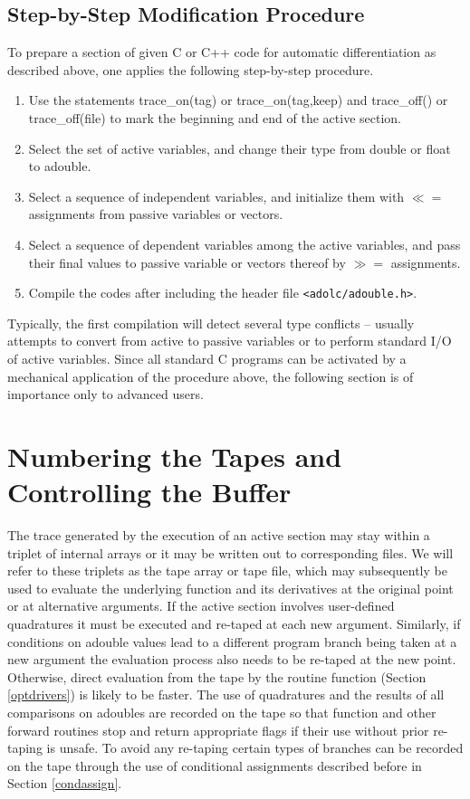 \documentclass[11pt,twoside]{article}
\begin{document}
\subsection{Step-by-Step Modification Procedure}
%
To prepare a section of given C or C++ code for automatic
differentiation as described above, one applies the following step-by-step procedure.
\begin{enumerate}
\item
Use the statements {\sf trace\_on(tag)} or {\sf trace\_on(tag,keep)}
and {\sf trace\_off()} or {\sf trace\_off(file)} to mark the
beginning and end of the active section. 
\item 
Select the set of active variables, and change their type from
{\sf double} or {\sf float} to {\sf adouble}.
\item
Select a sequence of independent variables, and initialize them with
\boldmath $\ll=$ \unboldmath assignments from passive variables or vectors.
\item
Select a sequence of dependent variables among the active variables,
and pass their final values to passive variable or vectors thereof
by \boldmath $\gg=$ \unboldmath assignments.
\item 
Compile the codes after including the header file \verb=<adolc/adouble.h>=. 
\end{enumerate}
Typically, the first compilation will detect several type conflicts
-- usually attempts to convert from active to passive
variables or to perform standard I/O of active variables.
Since all standard
C programs can be activated by a mechanical application of the
procedure above, the following section is of importance
only to advanced users. 
%                                                                  
\section{Numbering the Tapes and Controlling the Buffer}
\label{tape}
%
The trace generated by the execution of an active section may stay
within a triplet of internal arrays or it may be written out
to corresponding files. We will refer to these triplets as the 
tape array or tape file, which may subsequently be used to evaluate the
underlying function and its derivatives at the original point or at 
alternative arguments. If the active section involves user-defined
quadratures it must be executed and
re-taped at each new argument. Similarly, if conditions on
{\sf adouble} values lead to a different program branch being taken at 
a new argument the evaluation process also needs to be re-taped at the 
new point. Otherwise, direct evaluation from
the tape by the routine {\sf function} (Section \ref{optdrivers}) is 
likely to be
faster. The use of quadratures and the results of all comparisons on
{\sf adouble}s are recorded on the tape so that {\sf function} and other
forward routines stop and  return appropriate flags if their use without
prior re-taping is unsafe. To avoid any re-taping certain types of
branches can be recorded on the tape through
the use of conditional assignments  
described before in Section \ref{condassign}. 
\end{document}
